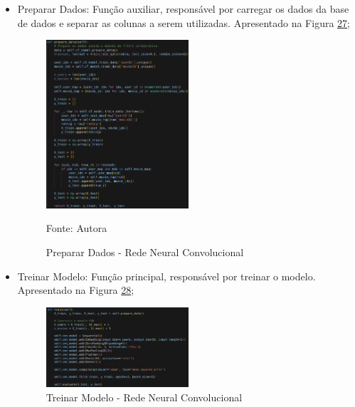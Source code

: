 \begin{itemize}
    \item Preparar Dados: Função auxiliar, responsável por carregar os dados da base de dados e separar as colunas a serem 
    utilizadas. Apresentado na Figura \hyperref[fig:prep-dados-cnn]{27};
    \begin{figure}[htbp]
        \centering
        \caption{Preparar Dados - Rede Neural Convolucional}
        \label{fig:prep-dados-cnn}
        
        \vspace{2pt} %
        
        \includegraphics[width=0.5\textwidth]{figuras/prep-dados-cnn.eps}
        
        \vspace{2pt} %
        
        \small Fonte: Autora
    \end{figure}

    \item Treinar Modelo: Função principal, responsável por treinar o modelo. Apresentado na Figura \hyperref[fig:train-cnn]{28};
    \begin{figure}[htbp]
        \centering
        \caption{Treinar Modelo - Rede Neural Convolucional}
        \label{fig:train-cnn}
        
        \vspace{2pt} %
        
        \includegraphics[width=0.5\textwidth]{figuras/train-cnn.eps}
        

\end{figure}
\end{itemize}
